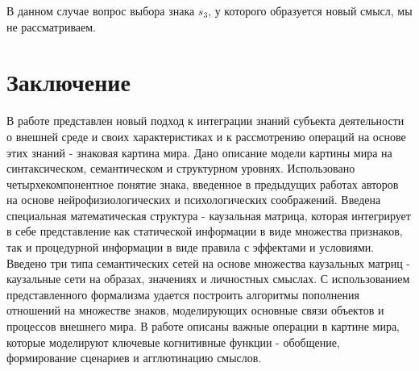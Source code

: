 \documentclass[12pt]{scrartcl}
\begin{document}
	В данном случае вопрос выбора знака $s_3$, у которого образуется новый смысл, мы не рассматриваем.
	
	\section*{Заключение}
	В работе представлен новый подход к интеграции знаний субъекта деятельности о внешней среде и своих характеристиках и к рассмотрению операций на основе этих знаний - знаковая картина мира. Дано описание модели картины мира на синтаксическом, семантическом и структурном уровнях. Использовано четырхекомпонентное понятие знака, введенное в предыдущих работах авторов на основе нейрофизиологических и психологических соображений. Введена специальная математическая структура - каузальная матрица, которая интегрирует в себе представление как статической информации в виде множества признаков, так и процедурной информации в виде правила с эффектами и условиями. Введено три типа семантических сетей на основе множества каузальных матриц - каузальные сети на образах, значениях и личностных смыслах. С использованием представленного формализма удается построить алгоритмы пополнения отношений на множестве знаков, моделирующих основные связи объектов и процессов внешнего мира. В работе описаны важные операции в картине мира, которые моделируют ключевые когнитивные функции - обобщение, формирование сценариев и агглютинацию смыслов.
	
	\printbibliography
\end{document}
